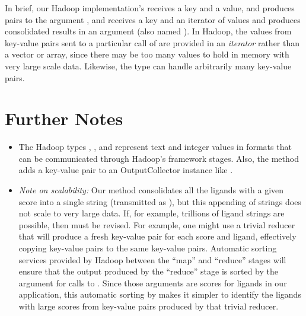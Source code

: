 \documentclass[letterpaper,10pt,openany,oneside]{sphinxmanual}
\begin{document}
In brief, our Hadoop implementation’s  receives a key and a value, and produces pairs to the  argument , and  receives a key and an iterator of values and produces consolidated results in an  argument (also named ). In Hadoop, the values from key-value pairs sent to a particular call of  are provided in an \emph{iterator} rather than a vector or array, since there may be too many values to hold in memory with very large scale data. Likewise, the  type can handle arbitrarily many key-value pairs.


\section{Further Notes}
\label{hadoop/hadoop:further-notes}\begin{itemize}
\item {} 
The Hadoop types , ,  and  represent text and integer values in formats that can be communicated through Hadoop’s framework stages. Also, the method  adds a key-value pair to an OutputCollector instance like .

\item {} 
\emph{Note on scalability:} Our  method consolidates all the ligands with a given score into a single string (transmitted as ), but this appending of strings does not scale to very large data. If, for example, trillions of ligand strings are possible, then  must be revised. For example, one might use a trivial reducer that will produce a fresh key-value pair for each score and ligand, effectively copying key-value pairs to the same key-value pairs. Automatic sorting services provided by Hadoop between the “map” and “reduce” stages will ensure that the output produced by the “reduce” stage is sorted by the  argument for calls to . Since those  arguments are scores for ligands in our application, this automatic sorting by  makes it simpler to identify the ligands with large scores from key-value pairs produced by that trivial reducer.

\end{itemize}
\end{document}

